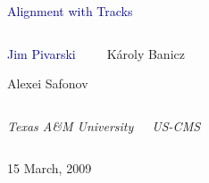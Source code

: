 \documentclass[compress]{beamer}
\begin{document}
\begin{frame}
\vfill
\begin{center}
\textcolor{darkblue}{\Large Alignment with Tracks}

\vfill
\begin{columns}
\begin{center}
\large
\textcolor{darkblue}{Jim Pivarski}

\vspace{0.2 cm}
Alexei Safonov
\end{center}

\begin{center}
\large
K\'aroly Banicz
\end{center}
\end{columns}

\begin{columns}
\begin{center}
\scriptsize
{\it Texas A\&M University}
\end{center}
\begin{center}
\scriptsize
{\it US-CMS}
\end{center}
\end{columns}

\vfill
15 March, 2009

\end{center}
\end{frame}


\small
\end{document}
